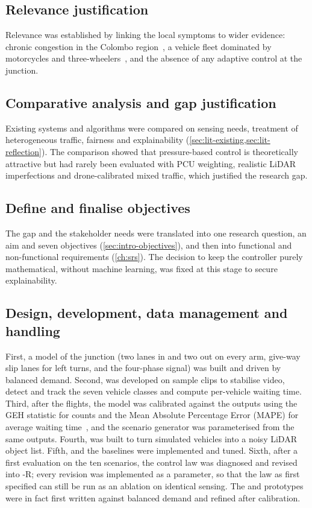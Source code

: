 \subsection{Relevance justification}
Relevance was established by linking the local symptoms to wider evidence: chronic congestion in the Colombo region~\cite{jica2014comtrans}, a vehicle fleet dominated by motorcycles and three-wheelers~\cite{dmt_stats}, and the absence of any adaptive control at the junction.

\subsection{Comparative analysis and gap justification}
Existing systems and algorithms were compared on sensing needs, treatment of heterogeneous traffic, fairness and explainability (\cref{sec:lit-existing,sec:lit-reflection}). The comparison showed that pressure-based control is theoretically attractive but had rarely been evaluated with PCU weighting, realistic LiDAR imperfections and drone-calibrated mixed traffic, which justified the research gap.

\subsection{Define and finalise objectives}
The gap and the stakeholder needs were translated into one research question, an aim and seven objectives (\cref{sec:intro-objectives}), and then into functional and non-functional requirements (\cref{ch:srs}). The decision to keep the controller purely mathematical, without machine learning, was fixed at this stage to secure explainability.

\subsection{Design, development, data management and handling}
First, a \sumo{} model of the junction (two lanes in and two out on every arm, give-way slip lanes for left turns, and the four-phase signal) was built and driven by balanced demand. Second, \dtx{} was developed on sample clips to stabilise video, detect and track the seven vehicle classes and compute per-vehicle waiting time. Third, after the flights, the model was calibrated against the \dtx{} outputs using the GEH statistic for counts and the Mean Absolute Percentage Error (MAPE) for average waiting time~\cite{dowling2004toolbox}, and the scenario generator was parameterised from the same outputs. Fourth, \vls{} was built to turn simulated vehicles into a noisy LiDAR object list. Fifth, \prism{} and the baselines were implemented and tuned. Sixth, after a first evaluation on the ten scenarios, the control law was diagnosed and revised into \prism{}-R; every revision was implemented as a parameter, so that the law as first specified can still be run as an ablation on identical sensing. The \vls{} and \prism{} prototypes were in fact first written against balanced demand and refined after calibration.

